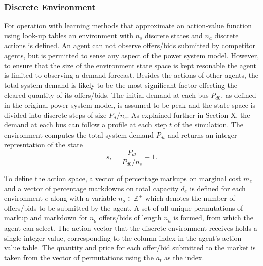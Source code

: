 \subsubsection{Discrete Environment}
For operation with learning methods that approximate an action-value function
using look-up tables an environment with $n_s$ discrete states and $n_a$
discrete actions is defined.  An agent can not observe offers/bids submitted by
competitor agents, but is permitted to sense any aspect of the power system
model.  However, to ensure that the size of the environment state space is kept
resonable the agent is limited to observing a demand forecast.  Besides the
actions of other agents, the total system demand is likely to be the most
significant factor effecting the cleared quantity of its offers/bids.  The
initial demand at each bus $P_{d0}$, as defined in the original power system
model, is assumed to be peak and the state space is divided into discrete steps
of size $P_d / n_s$.  As explained further in Section X, the demand at each bus
can follow a profile at each step $t$ of the simulation.  The environment
computes the total system demand $P_{d t}$ and returns an integer
represntation of the state
\begin{equation}
s_t = \frac{P_{d t}}{P_{d0} / n_s} + 1.
\end{equation}

To define the action space, a vector of percentage markups on marginal cost
$m_e$ and a vector of percentage markdowns on total capacity $d_e$ is defined
for each environment $e$ along with a variable $n_o \in \mathbb{Z}^+$ which
denotes the number of offers/bids to be submitted by the agent.  A set of all
unique permutations of markup and markdown for $n_o$ offers/bids of length
$n_a$ is formed, from which the agent can select.  The action vector that the
discrete environment receives holds a single integer value, corresponding to
the column index in the agent's action value table.  The quantity and price for
each offer/bid submitted to the market is taken from the vector of permutations
using the $a_t$ as the index.


